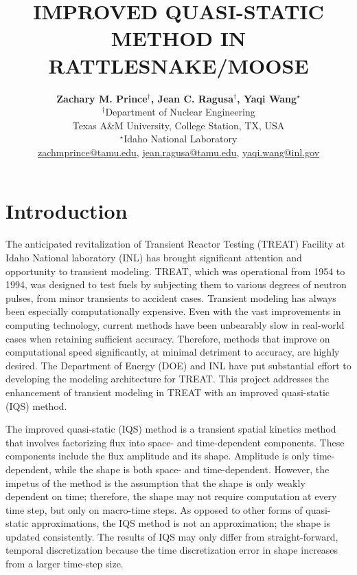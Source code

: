 \documentclass[12pt]{article}
\title{IMPROVED QUASI-STATIC METHOD IN RATTLESNAKE/MOOSE}
\author{ 
  \textbf{Zachary M. Prince$^\dagger$, Jean C. Ragusa$^\dagger$, Yaqi Wang$^\star$} \\
 $^\dagger$Department of Nuclear Engineering \\
  Texas A\&M University, College Station, TX, USA\\
  $^\star$Idaho National Laboratory\\
  \href{mailto:zachmprince@tamu.edu}{zachmprince@tamu.edu}, \href{jean.ragusa@tamu.edu}{jean.ragusa@tamu.edu}, \href{yaqi.wang@inl.gov}{yaqi.wang@inl.gov} 
}
\begin{document}

\maketitle

%
\section{Introduction}
\label{sect::intro}

The anticipated revitalization of Transient Reactor Testing (TREAT) Facility at Idaho National laboratory (INL) has brought significant attention and opportunity to transient modeling.  TREAT, which was operational from 1954 to 1994, was designed to test fuels by subjecting them to various degrees of neutron pulses, from minor transients to accident cases.  Transient modeling has always been especially computationally expensive. Even with the vast improvements in computing technology, current methods have been unbearably slow in real-world cases when retaining sufficient accuracy.  Therefore, methods that improve on computational speed significantly, at minimal detriment to accuracy, are highly desired. The Department of Energy (DOE) and INL have put substantial effort to developing the modeling architecture for TREAT.  This project addresses the enhancement of transient modeling in TREAT with an improved quasi-static (IQS) method.

The improved quasi-static (IQS) method is a transient spatial kinetics method that involves factorizing flux into space- and time-dependent components.  These components include the flux amplitude and its shape. Amplitude is only time-dependent, while the shape is both space- and time-dependent.  However, the impetus of the method is the assumption that the shape is only weakly dependent on time; therefore, the shape may not require computation at every time step, but only on macro-time steps. As opposed to other forms of quasi-static approximations, the IQS method is not an approximation; the shape is updated consistently.  The results of IQS may only differ from straight-forward, temporal discretization because the time discretization error in shape increases from a larger time-step size. 
\end{document}
